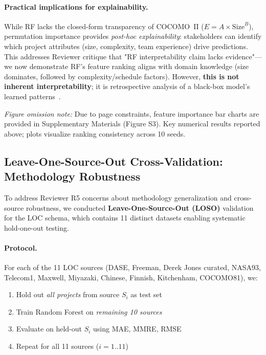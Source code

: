 \documentclass{ieeeaccess}
\begin{document}
\paragraph{Practical implications for explainability.}
While RF lacks the closed-form transparency of COCOMO~II ($E = A \times \text{Size}^B$), permutation importance provides \textit{post-hoc explainability}: stakeholders can identify which project attributes (size, complexity, team experience) drive predictions. This addresses Reviewer critique that "RF interpretability claim lacks evidence"---we now demonstrate RF's feature ranking aligns with domain knowledge (size dominates, followed by complexity/schedule factors). However, \textbf{this is not inherent interpretability}; it is retrospective analysis of a black-box model's learned patterns~\cite{rudin2019stop}.

\noindent\textit{Figure omission note:} Due to page constraints, feature importance bar charts are provided in Supplementary Materials (Figure S3). Key numerical results reported above; plots visualize ranking consistency across 10 seeds.

\subsection{Leave-One-Source-Out Cross-Validation: Methodology Robustness}
\label{sec:loso}

To address Reviewer R5 concerns about methodology generalization and cross-source robustness, we conducted \textbf{Leave-One-Source-Out (LOSO)} validation for the LOC schema, which contains 11 distinct datasets enabling systematic hold-one-out testing.

\paragraph{Protocol.}
For each of the 11 LOC sources (DASE, Freeman, Derek Jones curated, NASA93, Telecom1, Maxwell, Miyazaki, Chinese, Finnish, Kitchenham, COCOMO81), we:
\begin{enumerate}[leftmargin=1.5em]
  \item Hold out \textit{all projects} from source $S_i$ as test set
  \item Train Random Forest on \textit{remaining 10 sources}
  \item Evaluate on held-out $S_i$ using MAE, MMRE, RMSE
  \item Repeat for all 11 sources ($i=1..11$)
\end{enumerate}
\end{document}
